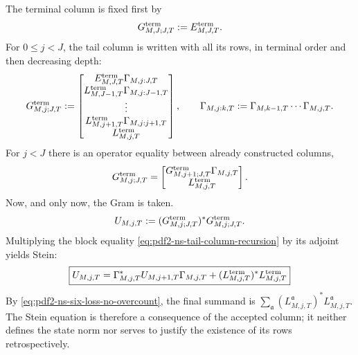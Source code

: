 The terminal column is fixed first by
\begin{equation}\label{eq:pdf2-ns-terminal-tail-column}
 \mathbf G_{M,J;J,T}^{\rm term}:=\mathcal E_{M,J,T}^{\rm term}.
\end{equation}
For $0\le j<J$, the tail column is written with all its rows, in
terminal order and then decreasing depth:
\begin{equation}\label{eq:pdf2-ns-complete-column}
 \mathbf G_{M,j;J,T}^{\rm term}:=
 \begin{bmatrix}
  \mathcal E_{M,J,T}^{\rm term}\Gamma_{M,j:J,T}\\
  L_{M,J-1,T}^{\rm term}\Gamma_{M,j:J-1,T}\\
  \vdots\\
  L_{M,j+1,T}^{\rm term}\Gamma_{M,j:j+1,T}\\
  L_{M,j,T}^{\rm term}
 \end{bmatrix},
 \qquad
 \Gamma_{M,j:k,T}:=\Gamma_{M,k-1,T}\cdots\Gamma_{M,j,T}.
\end{equation}
For $j<J$ there is an operator equality between already constructed columns,
\begin{equation}\label{eq:pdf2-ns-tail-column-recursion}
 \mathbf G_{M,j;J,T}^{\rm term}
 =\begin{bmatrix}
   \mathbf G_{M,j+1;J,T}^{\rm term}\Gamma_{M,j,T}\\
   L_{M,j,T}^{\rm term}
  \end{bmatrix}.
\end{equation}
Now, and only now, the Gram is taken.
\begin{equation}\label{eq:pdf2-ns-tail-gram}
 U_{M,j,T}:=
 (\mathbf G_{M,j;J,T}^{\rm term})^*
 \mathbf G_{M,j;J,T}^{\rm term}.
\end{equation}
Multiplying the block equality
\eqref{eq:pdf2-ns-tail-column-recursion} by its adjoint yields Stein:
\begin{equation}\label{eq:pdf2-ns-local-stein}
 \boxed{\begin{gathered}
 U_{M,j,T}=\Gamma_{M,j,T}^*U_{M,j+1,T}\Gamma_{M,j,T}
 +(L_{M,j,T}^{\rm term})^*L_{M,j,T}^{\rm term}
 \end{gathered}}
\end{equation}
By \eqref{eq:pdf2-ns-six-loss-no-overcount}, the final summand is
$\sum_{\mathfrak a}(L_{M,j,T}^{\mathfrak a})^*
L_{M,j,T}^{\mathfrak a}$. The Stein equation is therefore a consequence of
the accepted column; it neither defines the state norm nor serves to justify
the existence of its rows retrospectively.

